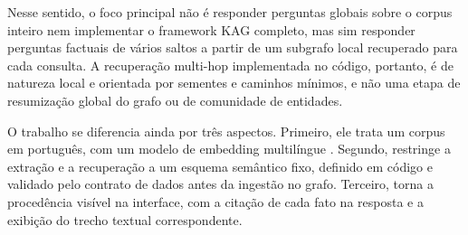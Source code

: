 Nesse sentido, o foco principal não é responder perguntas globais sobre o corpus inteiro nem implementar o framework KAG completo, mas sim responder perguntas factuais de vários saltos a partir de um subgrafo local recuperado para cada consulta. A recuperação multi-hop implementada no código, portanto, é de natureza local e orientada por sementes e caminhos mínimos, e não uma etapa de resumização global do grafo ou de comunidade de entidades.

O trabalho se diferencia ainda por três aspectos. Primeiro, ele trata um corpus em português, com um modelo de embedding multilíngue \cite{wang2024me5}. Segundo, restringe a extração e a recuperação a um esquema semântico fixo, definido em código e validado pelo contrato de dados antes da ingestão no grafo. Terceiro, torna a procedência visível na interface, com a citação de cada fato na resposta e a exibição do trecho textual correspondente.


